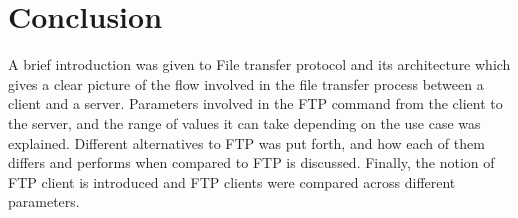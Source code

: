 \documentclass[9pt,twocolumn,twoside]{styles/osajnl}
\begin{document}
\section{Conclusion}

A brief introduction was given to File transfer protocol and its architecture which gives a clear picture of the flow involved in the file transfer process between a client and a server. Parameters involved in the FTP command from the client to the server, and the range of values it can take depending on the use case was explained. Different alternatives to FTP was put forth, and how each of them differs and performs when compared to FTP is discussed. Finally, the notion of FTP client is introduced and FTP clients were compared across different parameters.


\end{document}
